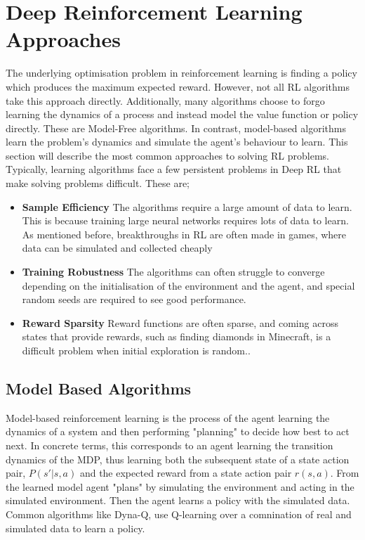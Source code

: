 \section{Deep Reinforcement Learning Approaches}
The underlying optimisation problem in reinforcement learning is finding a policy which produces the maximum expected reward. However, not all RL algorithms take this approach directly. Additionally, many algorithms choose to forgo learning the dynamics of a process and instead model the value function or policy directly. These are Model-Free algorithms. In contrast, model-based algorithms learn the problem's dynamics and simulate the agent's behaviour to learn. This section will describe the most common approaches to solving RL problems.
Typically, learning algorithms face a few persistent problems in Deep RL that make solving problems difficult. These are;
\begin{itemize}
	\item \textbf{Sample Efficiency}  The algorithms require a large amount of data to learn. This is because training large neural networks requires lots of data to learn. As mentioned before, breakthroughs in RL are often made in games, where data can be simulated and collected cheaply\cite{dulac2019challenges}
	\item \textbf{Training Robustness} The algorithms can often struggle to converge depending on the initialisation of the environment and the agent, and special random seeds are required to see good performance\cite{henderson2018deep}.
	\item \textbf{Reward Sparsity} Reward functions are often sparse, and coming across states that provide rewards, such as finding diamonds in Minecraft, is a difficult problem when initial exploration is random.\cite{hafner2023mastering}.
\end{itemize}

\subsection{Model Based Algorithms}
Model-based reinforcement learning is the process of the agent learning the dynamics of a system and then performing "planning" to decide how best to act next. In concrete terms, this corresponds to an agent learning the transition
dynamics of the MDP, thus learning both the subsequent state of a state action pair, $P(s'| s, a)$ and the expected reward from a state action pair $r(s, a)$. From the learned model agent "plans" by simulating the environment and acting in the simulated environment. Then the agent learns a policy with the simulated data. Common algorithms like Dyna-Q, use Q-learning over a comnination of real and simulated data to learn a policy. 

